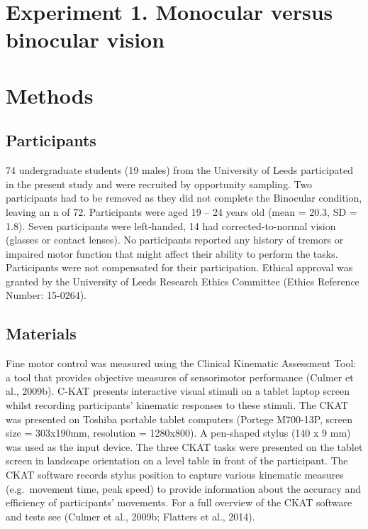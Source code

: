 \documentclass[
  english,
  man,floatsintext]{apa6}
\begin{document}
\hypertarget{experiment-1.-monocular-versus-binocular-vision}{%
\section{Experiment 1. Monocular versus binocular vision}\label{experiment-1.-monocular-versus-binocular-vision}}

\hypertarget{methods}{%
\section{Methods}\label{methods}}

\hypertarget{participants}{%
\subsection{Participants}\label{participants}}

74 undergraduate students (19 males) from the University of Leeds participated in the present study and were recruited by opportunity sampling.
Two participants had to be removed as they did not complete the Binocular condition, leaving an n of 72.
Participants were aged 19 -- 24 years old (mean = 20.3, SD = 1.8).
Seven participants were left-handed, 14 had corrected-to-normal vision (glasses or contact lenses).
No participants reported any history of tremors or impaired motor function that might affect their ability to perform the tasks.
Participants were not compensated for their participation.
Ethical approval was granted by the University of Leeds Research Ethics Committee (Ethics Reference Number: 15-0264).

\hypertarget{materials}{%
\subsection{Materials}\label{materials}}

Fine motor control was measured using the Clinical Kinematic Assessment Tool: a tool that provides objective measures of sensorimotor performance (Culmer et al., 2009b).
C-KAT presents interactive visual stimuli on a tablet laptop screen whilst recording participants' kinematic responses to these stimuli.
The CKAT was presented on Toshiba portable tablet computers (Portege M700-13P, screen size = 303x190mm, resolution = 1280x800).
A pen-shaped stylus (140 x 9 mm) was used as the input device.
The three CKAT tasks were presented on the tablet screen in landscape orientation on a level table in front of the participant.
The CKAT software records stylus position to capture various kinematic measures (e.g.~movement time, peak speed) to provide information about the accuracy and efficiency of participants' movements.
For a full overview of the CKAT software and tests see (Culmer et al., 2009b; Flatters et al., 2014).
\end{document}
